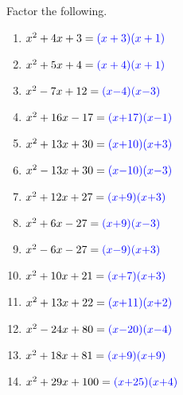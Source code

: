 \begin{myexample}
Factor the following.
\drillandskill
\end{myexample}
\begin{multicols}{2}
	\begin{enumerate}
		\item $x^2 + 4x+3 = {\color{blue}{(x+{3})}}{\color{blue}{(x+{1})}}$
		\item $x^2+5x+4 = {\color{blue}{(x+{4})}}{\color{blue}{(x+{1})}}$
		\item $x^2-7x+12={\color{blue}{(x{-4})}}{\color{blue}{(x{-3})}}$
		\item $x^2+16x-17={\color{blue}{(x{+17})}}{\color{blue}{(x{-1})}}$
		\item $x^2+13x+30={\color{blue}{(x{+10})}}{\color{blue}{(x{+3})}}$
		\item $x^2-13x+30={\color{blue}{(x{-10})}}{\color{blue}{(x{-3})}}$
		\item $x^2+12x+27={\color{blue}{(x{+9})}}{\color{blue}{(x{+3})}}$
		\item $x^2+6x-27={\color{blue}{(x{+9})}}{\color{blue}{(x{-3})}}$
		\item $x^2-6x-27={\color{blue}{(x{-9})}}{\color{blue}{(x{+3})}}$
		\item $x^2+10x+21={\color{blue}{(x{+7})}}{\color{blue}{(x{+3})}}$
		\item $x^2+13x+22={\color{blue}{(x{+11})}}{\color{blue}{(x{+2})}}$
		\item $x^2-24x+80={\color{blue}{(x{-20})}}{\color{blue}{(x{-4})}}$
		\item $x^2+18x+81={\color{blue}{(x{+9})}}{\color{blue}{(x{+9})}}$
		\item $x^2+29x+100={\color{blue}{(x{+25})}}{\color{blue}{(x{+4})}}$
	\end{enumerate} 
\end{multicols}


